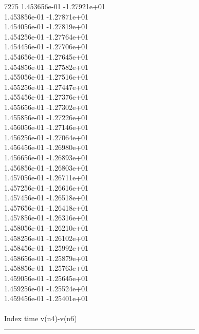 7275	1.453656e-01	-1.27921e+01	\\ 	1.453856e-01	-1.27871e+01	\\ 	1.454056e-01	-1.27819e+01	\\ 	1.454256e-01	-1.27764e+01	\\ 	1.454456e-01	-1.27706e+01	\\ 	1.454656e-01	-1.27645e+01	\\ 	1.454856e-01	-1.27582e+01	\\ 	1.455056e-01	-1.27516e+01	\\ 	1.455256e-01	-1.27447e+01	\\ 	1.455456e-01	-1.27376e+01	\\ 	1.455656e-01	-1.27302e+01	\\ 	1.455856e-01	-1.27226e+01	\\ 	1.456056e-01	-1.27146e+01	\\ 	1.456256e-01	-1.27064e+01	\\ 	1.456456e-01	-1.26980e+01	\\ 	1.456656e-01	-1.26893e+01	\\ 	1.456856e-01	-1.26803e+01	\\ 	1.457056e-01	-1.26711e+01	\\ 	1.457256e-01	-1.26616e+01	\\ 	1.457456e-01	-1.26518e+01	\\ 	1.457656e-01	-1.26418e+01	\\ 	1.457856e-01	-1.26316e+01	\\ 	1.458056e-01	-1.26210e+01	\\ 	1.458256e-01	-1.26102e+01	\\ 	1.458456e-01	-1.25992e+01	\\ 	1.458656e-01	-1.25879e+01	\\ 	1.458856e-01	-1.25763e+01	\\ 	1.459056e-01	-1.25645e+01	\\ 	1.459256e-01	-1.25524e+01	\\ 	1.459456e-01	-1.25401e+01	\\ \hline
\\ \hline
Index   time            v(n4)-v(n6)     \\ \hline
--------------------------------------------------------------------------------\\ \hline
